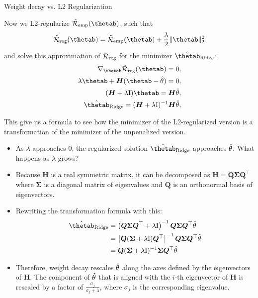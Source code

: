 \begin{vbframe}{Weight decay vs. L2 Regularization}
\lz

Now we L2-regularize $\mathcal{\tilde R}_{\text{emp}}(\thetab)$, such that 
\[
\mathcal{\tilde R}_{\text{reg}}(\thetab) = \mathcal{\tilde R}_{\text{emp}}(\thetab) + \frac{\lambda}{2} \|\thetab\|^2_2\]
and solve this approximation of $\mathcal{R}_{\text{reg}}$ for the minimizer $\hat{\thetab}_{\text{Ridge}}$:
\begin{align*}
 \nabla_{\thetab}\mathcal{\tilde R}_{\text{reg}}(\thetab) = 0,\\
  \lambda \thetab + \bm{H}(\thetab - \thetah) = 0,\\
      (\bm{H} + \lambda \id) \thetab = \bm{H} \thetah,\\
      \hat{\thetab}_{\text{Ridge}} = (\bm{H} + \lambda \id)^{-1}\bm{H} \thetah,
\end{align*}

This give us a formula to see how the minimizer of the L2-regularized version is a transformation of the minimizer of the unpenalized version.


\framebreak

  \begin{itemize}
    \item As $\lambda$ approaches $0$, the regularized solution $\hat{\thetab}_{\text{Ridge}}$ approaches $\hat{\theta}$. What happens as $\lambda$ grows?
    \item Because $\bm{H}$ is a real symmetric matrix, it can be decomposed as $\bm{H} = \bm{Q} \bm{\Sigma} \bm{Q}^\top$ where $\bm{\Sigma}$ is a diagonal matrix of eigenvalues and $\bm{Q}$ is an orthonormal basis of eigenvectors.
    \item Rewriting the transformation formula with this:
  \begin{equation*}
    \begin{aligned} 
    \hat{\thetab}_{\text{Ridge}} &=\left(\bm{Q} \bm{\Sigma} \bm{Q}^{\top}+\lambda \id\right)^{-1} \bm{Q} \bm{\Sigma} \bm{Q}^{\top} \thetah \\ 
              &=\left[\bm{Q}(\bm{\Sigma}+\lambda \id) \bm{Q}^{\top}\right]^{-1} \bm{Q} \bm{\Sigma} \bm{Q}^{\top} \thetah \\ 
              &=\bm{Q}(\bm{\Sigma} + \lambda \id)^{-1} \bm{\Sigma} \bm{Q}^{\top} \thetah 
    \end{aligned}
  \end{equation*}
    \item Therefore, weight decay rescales $\hat{\theta}$ along the axes defined by the eigenvectors of $\bm{H}$. The component of $\hat{\theta}$ that is aligned with the $i$-th eigenvector of $\bm{H}$ is rescaled by a factor of $\frac{\sigma_j}{\sigma_j + \lambda}$, where $\sigma_j$ is the corresponding eigenvalue.
\end{itemize}


\end{vbframe}
